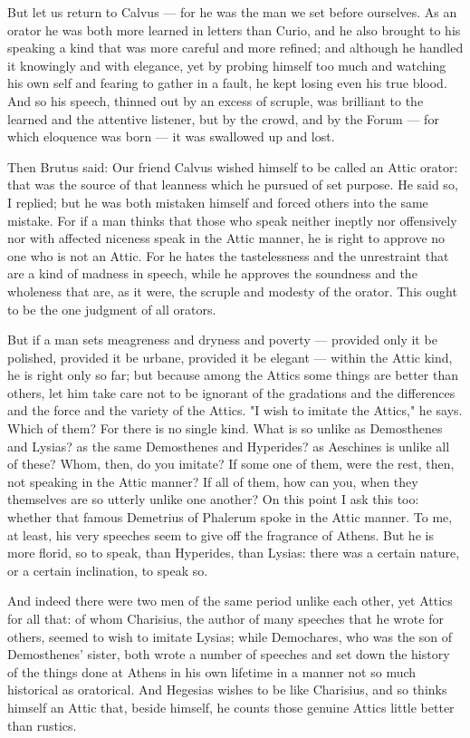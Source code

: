  But let us return to Calvus — for he was the man we set before ourselves. As an orator he was both more learned in letters than Curio, and he also brought to his speaking a kind that was more careful and more refined; and although he handled it knowingly and with elegance, yet by probing himself too much and watching his own self and fearing to gather in a fault, he kept losing even his true blood. And so his speech, thinned out by an excess of scruple, was brilliant to the learned and the attentive listener, but by the crowd, and by the Forum — for which eloquence was born — it was swallowed up and lost.

 Then Brutus said: Our friend Calvus wished himself to be called an Attic orator: that was the source of that leanness which he pursued of set purpose. He said so, I replied; but he was both mistaken himself and forced others into the same mistake. For if a man thinks that those who speak neither ineptly nor offensively nor with affected niceness speak in the Attic manner, he is right to approve no one who is not an Attic. For he hates the tastelessness and the unrestraint that are a kind of madness in speech, while he approves the soundness and the wholeness that are, as it were, the scruple and modesty of the orator. This ought to be the one judgment of all orators.

 But if a man sets meagreness and dryness and poverty — provided only it be polished, provided it be urbane, provided it be elegant — within the Attic kind, he is right only so far; but because among the Attics some things are better than others, let him take care not to be ignorant of the gradations and the differences and the force and the variety of the Attics. "I wish to imitate the Attics," he says. Which of them? For there is no single kind. What is so unlike as Demosthenes and Lysias? as the same Demosthenes and Hyperides? as Aeschines is unlike all of these? Whom, then, do you imitate? If some one of them, were the rest, then, not speaking in the Attic manner? If all of them, how can you, when they themselves are so utterly unlike one another? On this point I ask this too: whether that famous Demetrius of Phalerum spoke in the Attic manner. To me, at least, his very speeches seem to give off the fragrance of Athens. But he is more florid, so to speak, than Hyperides, than Lysias: there was a certain nature, or a certain inclination, to speak so.

 And indeed there were two men of the same period unlike each other, yet Attics for all that: of whom Charisius, the author of many speeches that he wrote for others, seemed to wish to imitate Lysias; while Demochares, who was the son of Demosthenes' sister, both wrote a number of speeches and set down the history of the things done at Athens in his own lifetime in a manner not so much historical as oratorical. And Hegesias wishes to be like Charisius, and so thinks himself an Attic that, beside himself, he counts those genuine Attics little better than rustics.

